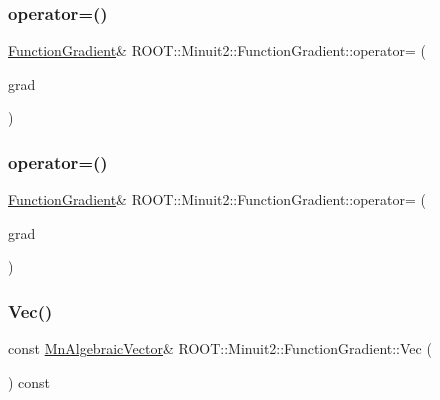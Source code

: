 \subsubsection{\texorpdfstring{operator=()}{operator=()}\hspace{0.1cm}{\footnotesize\ttfamily [1/2]}}
{\footnotesize\ttfamily \mbox{\hyperlink{classROOT_1_1Minuit2_1_1FunctionGradient}{Function\+Gradient}}\& R\+O\+O\+T\+::\+Minuit2\+::\+Function\+Gradient\+::operator= (\begin{DoxyParamCaption}\item[{const \mbox{\hyperlink{classROOT_1_1Minuit2_1_1FunctionGradient}{Function\+Gradient}} \&}]{grad }\end{DoxyParamCaption})\hspace{0.3cm}{\ttfamily [inline]}}

\mbox{\label{classROOT_1_1Minuit2_1_1FunctionGradient_a0b85ff1f65dbefea4c3953898efb06ec}} 
\subsubsection{\texorpdfstring{operator=()}{operator=()}\hspace{0.1cm}{\footnotesize\ttfamily [2/2]}}
{\footnotesize\ttfamily \mbox{\hyperlink{classROOT_1_1Minuit2_1_1FunctionGradient}{Function\+Gradient}}\& R\+O\+O\+T\+::\+Minuit2\+::\+Function\+Gradient\+::operator= (\begin{DoxyParamCaption}\item[{const \mbox{\hyperlink{classROOT_1_1Minuit2_1_1FunctionGradient}{Function\+Gradient}} \&}]{grad }\end{DoxyParamCaption})\hspace{0.3cm}{\ttfamily [inline]}}

\mbox{\label{classROOT_1_1Minuit2_1_1FunctionGradient_abdf0fd7d9e1a730049112f0c903a9f5f}} 
\subsubsection{\texorpdfstring{Vec()}{Vec()}\hspace{0.1cm}{\footnotesize\ttfamily [1/2]}}
{\footnotesize\ttfamily const \mbox{\hyperlink{namespaceROOT_1_1Minuit2_a62ed97730a1ca8d3fbaec64a19aa11c9}{Mn\+Algebraic\+Vector}}\& R\+O\+O\+T\+::\+Minuit2\+::\+Function\+Gradient\+::\+Vec (\begin{DoxyParamCaption}{ }\end{DoxyParamCaption}) const\hspace{0.3cm}{\ttfamily [inline]}}

